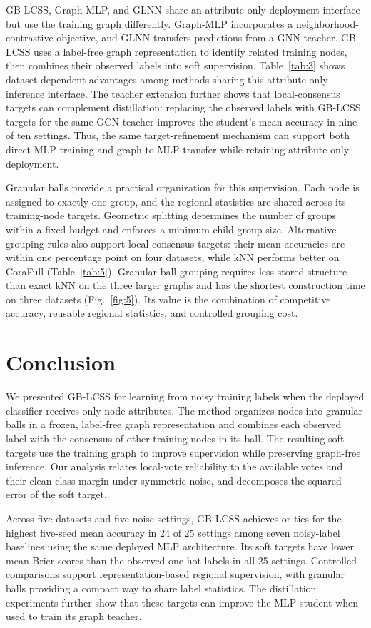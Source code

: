 \documentclass[10pt,letterpaper,nopreprintline]{elsarticle}
\theoremstyle{plain}
\begin{document}
GB-LCSS, Graph-MLP, and GLNN share an attribute-only deployment interface but use the training graph differently. Graph-MLP incorporates a neighborhood-contrastive objective, and GLNN transfers predictions from a GNN teacher. GB-LCSS uses a label-free graph representation to identify related training nodes, then combines their observed labels into soft supervision. Table~\ref{tab:3} shows dataset-dependent advantages among methods sharing this attribute-only inference interface. The teacher extension further shows that local-consensus targets can complement distillation: replacing the observed labels with GB-LCSS targets for the same GCN teacher improves the student's mean accuracy in nine of ten settings. Thus, the same target-refinement mechanism can support both direct MLP training and graph-to-MLP transfer while retaining attribute-only deployment.

Granular balls provide a practical organization for this supervision. Each node is assigned to exactly one group, and the regional statistics are shared across its training-node targets. Geometric splitting determines the number of groups within a fixed budget and enforces a minimum child-group size. Alternative grouping rules also support local-consensus targets: their mean accuracies are within one percentage point on four datasets, while kNN performs better on CoraFull (Table~\ref{tab:5}). Granular ball grouping requires less stored structure than exact kNN on the three larger graphs and has the shortest construction time on three datasets (Fig.~\ref{fig:5}). Its value is the combination of competitive accuracy, reusable regional statistics, and controlled grouping cost.

\section{Conclusion}\label{sec:5}

We presented GB-LCSS for learning from noisy training labels when the deployed classifier receives only node attributes. The method organizes nodes into granular balls in a frozen, label-free graph representation and combines each observed label with the consensus of other training nodes in its ball. The resulting soft targets use the training graph to improve supervision while preserving graph-free inference. Our analysis relates local-vote reliability to the available votes and their clean-class margin under symmetric noise, and decomposes the squared error of the soft target.

Across five datasets and five noise settings, GB-LCSS achieves or ties for the highest five-seed mean accuracy in 24 of 25 settings among seven noisy-label baselines using the same deployed MLP architecture. Its soft targets have lower mean Brier scores than the observed one-hot labels in all 25 settings. Controlled comparisons support representation-based regional supervision, with granular balls providing a compact way to share label statistics. The distillation experiments further show that these targets can improve the MLP student when used to train its graph teacher.
\end{document}
